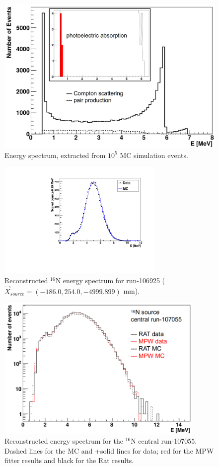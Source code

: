 \begin{figure}[htbp]
	\centering
	\includegraphics[width=12cm]{N16_MCenergySpectrum.png}
	\caption{Energy spectrum, extracted from $10^5$ MC simulation events.}
	\label{N16nhitsSimu}
\end{figure}


\begin{figure}[htbp]
	\centering
	\includegraphics[width=8cm]{N16energyMPWcompare_106925.pdf}
	\caption{Reconstructed $^{16}$N energy spectrum for run-106925 ($\vec{X}_{source}=(-186.0,254.0,-4999.899)$ mm).}
	\label{N16_106925}
\end{figure}


\begin{figure}[htbp]
	\centering
	\includegraphics[width=10cm]{N16_reconE_107055.png}
	\caption{Reconstructed energy spectrum for the $^{16}$N central run-107055. Dashed lines for the MC and +solid lines for data; red for the MPW fitter results and black for the Rat results.}
	\label{N16energy}
\end{figure}

